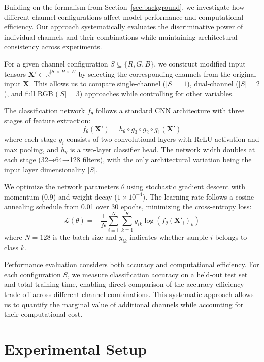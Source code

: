 \documentclass{article} %
\begin{document}
Building on the formalism from Section~\ref{sec:background}, we investigate how different channel configurations affect model performance and computational efficiency. Our approach systematically evaluates the discriminative power of individual channels and their combinations while maintaining architectural consistency across experiments.

For a given channel configuration $S \subseteq \{R,G,B\}$, we construct modified input tensors $\mathbf{X'} \in \mathbb{R}^{|S| \times H \times W}$ by selecting the corresponding channels from the original input $\mathbf{X}$. This allows us to compare single-channel ($|S|=1$), dual-channel ($|S|=2$), and full RGB ($|S|=3$) approaches while controlling for other variables.

The classification network $f_\theta$ follows a standard CNN architecture with three stages of feature extraction:
\begin{equation}
f_\theta(\mathbf{X'}) = h_\theta \circ g_3 \circ g_2 \circ g_1(\mathbf{X'})
\end{equation}
where each stage $g_i$ consists of two convolutional layers with ReLU activation and max pooling, and $h_\theta$ is a two-layer classifier head. The network width doubles at each stage (32→64→128 filters), with the only architectural variation being the input layer dimensionality $|S|$.

We optimize the network parameters $\theta$ using stochastic gradient descent with momentum (0.9) and weight decay ($1\times10^{-4}$). The learning rate follows a cosine annealing schedule from 0.01 over 30 epochs, minimizing the cross-entropy loss:
\begin{equation}
\mathcal{L}(\theta) = -\frac{1}{N}\sum_{i=1}^N\sum_{k=1}^K y_{ik}\log(f_\theta(\mathbf{X'}_i)_k)
\end{equation}
where $N=128$ is the batch size and $y_{ik}$ indicates whether sample $i$ belongs to class $k$.

Performance evaluation considers both accuracy and computational efficiency. For each configuration $S$, we measure classification accuracy on a held-out test set and total training time, enabling direct comparison of the accuracy-efficiency trade-off across different channel combinations. This systematic approach allows us to quantify the marginal value of additional channels while accounting for their computational cost.

\section{Experimental Setup}
\label{sec:experimental}
\end{document}
